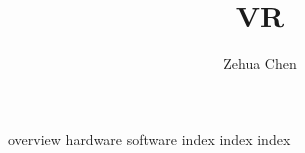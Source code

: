 \documentclass[letterpaper, 11pt]{report}
\title{VR}
\author{Zehua Chen}
\begin{document}
  \maketitle
  \tableofcontents

  \setmainstyles

  {overview}
  {hardware}
  {software}
  {index}
  {index}
  {index}
\end{document}
